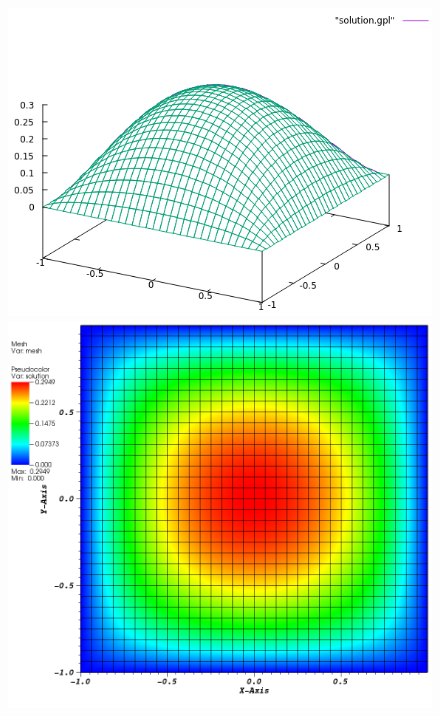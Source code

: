 \documentclass[11pt,fullpage]{article}
\theoremstyle{lemma}
\theoremstyle{definition}
\theoremstyle{lemma}
\begin{document}
\begin{figure}[!ht]
	\begin{minipage}{.4\paperwidth}
		\centering
		\includegraphics[scale=.45]{Step3-gnuplot.png}
	\end{minipage}%
	\begin{minipage}{.4\paperwidth}
		\centering
		\includegraphics[scale=.7]{Step3-visit.png}
	\end{minipage}
\end{figure}
\clearpage
\end{document}
